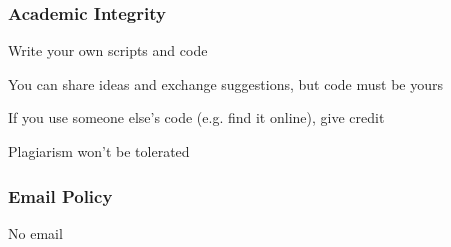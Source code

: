 \documentclass[12pt]{beamer}\usepackage[]{graphicx}\usepackage[]{color}
\begin{document}

\begin{frame}
\frametitle{}
\begin{center}
\end{center}
\end{frame}


\begin{frame}
\frametitle{}
\begin{center}
\end{center}
\end{frame}


\begin{frame}
\begin{center}
\end{center}
\end{frame}


\begin{frame}
\begin{center}
\end{center}
\end{frame}


\begin{frame}
\frametitle{Academic Integrity}

\bi
 \item Write your own scripts and code
 \item You can share ideas and exchange suggestions, but code must be yours
 \item If you use someone else's code (e.g. find it online), give credit
 \item Plagiarism won't be tolerated
\ei

\end{frame}


\begin{frame}
\frametitle{Email Policy}

\begin{center}
\Huge No email
\end{center}

\end{frame}
\end{document}
